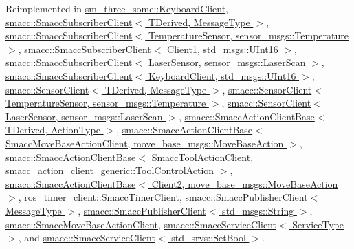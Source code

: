 Reimplemented in \hyperlink{classsm__three__some_1_1KeyboardClient_a8a74266ba37df7f09518b9689ddee828}{sm\+\_\+three\+\_\+some\+::\+Keyboard\+Client}, \hyperlink{classsmacc_1_1SmaccSubscriberClient_afc2e5523c38250722e7197dd535599ce}{smacc\+::\+Smacc\+Subscriber\+Client$<$ T\+Derived, Message\+Type $>$}, \hyperlink{classsmacc_1_1SmaccSubscriberClient_afc2e5523c38250722e7197dd535599ce}{smacc\+::\+Smacc\+Subscriber\+Client$<$ Temperature\+Sensor, sensor\+\_\+msgs\+::\+Temperature $>$}, \hyperlink{classsmacc_1_1SmaccSubscriberClient_afc2e5523c38250722e7197dd535599ce}{smacc\+::\+Smacc\+Subscriber\+Client$<$ Client1, std\+\_\+msgs\+::\+U\+Int16 $>$}, \hyperlink{classsmacc_1_1SmaccSubscriberClient_afc2e5523c38250722e7197dd535599ce}{smacc\+::\+Smacc\+Subscriber\+Client$<$ Laser\+Sensor, sensor\+\_\+msgs\+::\+Laser\+Scan $>$}, \hyperlink{classsmacc_1_1SmaccSubscriberClient_afc2e5523c38250722e7197dd535599ce}{smacc\+::\+Smacc\+Subscriber\+Client$<$ Keyboard\+Client, std\+\_\+msgs\+::\+U\+Int16 $>$}, \hyperlink{classsmacc_1_1SensorClient_ab772bc1d3e1db37a39d3d1992b06cec2}{smacc\+::\+Sensor\+Client$<$ T\+Derived, Message\+Type $>$}, \hyperlink{classsmacc_1_1SensorClient_ab772bc1d3e1db37a39d3d1992b06cec2}{smacc\+::\+Sensor\+Client$<$ Temperature\+Sensor, sensor\+\_\+msgs\+::\+Temperature $>$}, \hyperlink{classsmacc_1_1SensorClient_ab772bc1d3e1db37a39d3d1992b06cec2}{smacc\+::\+Sensor\+Client$<$ Laser\+Sensor, sensor\+\_\+msgs\+::\+Laser\+Scan $>$}, \hyperlink{classsmacc_1_1SmaccActionClientBase_a717b234a3e26ea778cce7635fb924e59}{smacc\+::\+Smacc\+Action\+Client\+Base$<$ T\+Derived, Action\+Type $>$}, \hyperlink{classsmacc_1_1SmaccActionClientBase_a717b234a3e26ea778cce7635fb924e59}{smacc\+::\+Smacc\+Action\+Client\+Base$<$ Smacc\+Move\+Base\+Action\+Client, move\+\_\+base\+\_\+msgs\+::\+Move\+Base\+Action $>$}, \hyperlink{classsmacc_1_1SmaccActionClientBase_a717b234a3e26ea778cce7635fb924e59}{smacc\+::\+Smacc\+Action\+Client\+Base$<$ Smacc\+Tool\+Action\+Client, smacc\+\_\+action\+\_\+client\+\_\+generic\+::\+Tool\+Control\+Action $>$}, \hyperlink{classsmacc_1_1SmaccActionClientBase_a717b234a3e26ea778cce7635fb924e59}{smacc\+::\+Smacc\+Action\+Client\+Base$<$ Client2, move\+\_\+base\+\_\+msgs\+::\+Move\+Base\+Action $>$}, \hyperlink{classros__timer__client_1_1SmaccTimerClient_a23ca454fd2d9035bb5142c0b9261635a}{ros\+\_\+timer\+\_\+client\+::\+Smacc\+Timer\+Client}, \hyperlink{classsmacc_1_1SmaccPublisherClient_ac1b9a683a411f4957411fcbdb3980233}{smacc\+::\+Smacc\+Publisher\+Client$<$ Message\+Type $>$}, \hyperlink{classsmacc_1_1SmaccPublisherClient_ac1b9a683a411f4957411fcbdb3980233}{smacc\+::\+Smacc\+Publisher\+Client$<$ std\+\_\+msgs\+::\+String $>$}, \hyperlink{classsmacc_1_1SmaccMoveBaseActionClient_ae520045638a5f722ad1367f6d705b7c4}{smacc\+::\+Smacc\+Move\+Base\+Action\+Client}, \hyperlink{classsmacc_1_1SmaccServiceClient_a9ac26f1ca1e661e6b393ce7605166bdc}{smacc\+::\+Smacc\+Service\+Client$<$ Service\+Type $>$}, and \hyperlink{classsmacc_1_1SmaccServiceClient_a9ac26f1ca1e661e6b393ce7605166bdc}{smacc\+::\+Smacc\+Service\+Client$<$ std\+\_\+srvs\+::\+Set\+Bool $>$}.



